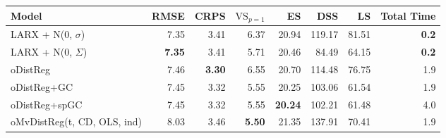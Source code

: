 \begin{tabular}{lrrrrrrr}
\toprule
Model & RMSE & CRPS & $\text{VS}_{p=1}$ & ES & DSS & LS & Total Time \\
\midrule
LARX + N(0, $\sigma$) & {\cellcolor[HTML]{30123B}} \color[HTML]{F1F1F1} 7.35 & {\cellcolor[HTML]{4682F8}} \color[HTML]{F1F1F1} 3.41 & {\cellcolor[HTML]{E4450A}} \color[HTML]{F1F1F1} 6.37 & {\cellcolor[HTML]{448FFE}} \color[HTML]{F1F1F1} 20.94 & {\cellcolor[HTML]{FABA39}} \color[HTML]{000000} 119.17 & {\cellcolor[HTML]{7A0403}} \color[HTML]{F1F1F1} 81.51 & {\cellcolor[HTML]{30123B}} \color[HTML]{F1F1F1} \bfseries 0.2 \\
LARX + N(0, $\Sigma$) & {\cellcolor[HTML]{30123B}} \color[HTML]{F1F1F1} \bfseries 7.35 & {\cellcolor[HTML]{4682F8}} \color[HTML]{F1F1F1} 3.41 & {\cellcolor[HTML]{3D9EFE}} \color[HTML]{F1F1F1} 5.71 & {\cellcolor[HTML]{3F3B97}} \color[HTML]{F1F1F1} 20.46 & {\cellcolor[HTML]{3E3891}} \color[HTML]{F1F1F1} 84.49 & {\cellcolor[HTML]{1CE6B4}} \color[HTML]{000000} 64.15 & {\cellcolor[HTML]{30123B}} \color[HTML]{F1F1F1} \bfseries 0.2 \\
oDistReg & {\cellcolor[HTML]{4249B1}} \color[HTML]{F1F1F1} 7.46 & {\cellcolor[HTML]{30123B}} \color[HTML]{F1F1F1} \bfseries 3.30 & {\cellcolor[HTML]{7A0403}} \color[HTML]{F1F1F1} 6.55 & {\cellcolor[HTML]{4669E0}} \color[HTML]{F1F1F1} 20.70 & {\cellcolor[HTML]{D9E436}} \color[HTML]{000000} 114.48 & {\cellcolor[HTML]{EA4E0D}} \color[HTML]{F1F1F1} 76.75 & {\cellcolor[HTML]{3B2F80}} \color[HTML]{F1F1F1} 1.9 \\
oDistReg+GC & {\cellcolor[HTML]{4146AC}} \color[HTML]{F1F1F1} 7.45 & {\cellcolor[HTML]{38276D}} \color[HTML]{F1F1F1} 3.32 & {\cellcolor[HTML]{3D358B}} \color[HTML]{F1F1F1} 5.55 & {\cellcolor[HTML]{30123B}} \color[HTML]{F1F1F1} 20.25 & {\cellcolor[HTML]{35F394}} \color[HTML]{000000} 103.06 & {\cellcolor[HTML]{2FB2F4}} \color[HTML]{F1F1F1} 61.54 & {\cellcolor[HTML]{3B2F80}} \color[HTML]{F1F1F1} 1.9 \\
oDistReg+spGC & {\cellcolor[HTML]{4143A7}} \color[HTML]{F1F1F1} 7.45 & {\cellcolor[HTML]{372466}} \color[HTML]{F1F1F1} 3.32 & {\cellcolor[HTML]{3D358B}} \color[HTML]{F1F1F1} 5.55 & {\cellcolor[HTML]{30123B}} \color[HTML]{F1F1F1} \bfseries 20.24 & {\cellcolor[HTML]{2AEFA1}} \color[HTML]{000000} 102.21 & {\cellcolor[HTML]{31AFF5}} \color[HTML]{F1F1F1} 61.48 & {\cellcolor[HTML]{4454C3}} \color[HTML]{F1F1F1} 4.0 \\
oMvDistReg(t, CD, OLS, ind) & {\cellcolor[HTML]{79FE59}} \color[HTML]{000000} 8.03 & {\cellcolor[HTML]{2CB7F0}} \color[HTML]{F1F1F1} 3.46 & {\cellcolor[HTML]{30123B}} \color[HTML]{F1F1F1} \bfseries 5.50 & {\cellcolor[HTML]{1AD2D2}} \color[HTML]{000000} 21.35 & {\cellcolor[HTML]{7A0403}} \color[HTML]{F1F1F1} 137.91 & {\cellcolor[HTML]{D4E735}} \color[HTML]{000000} 70.41 & {\cellcolor[HTML]{3B2F80}} \color[HTML]{F1F1F1} 1.9 \\

\end{tabular}
